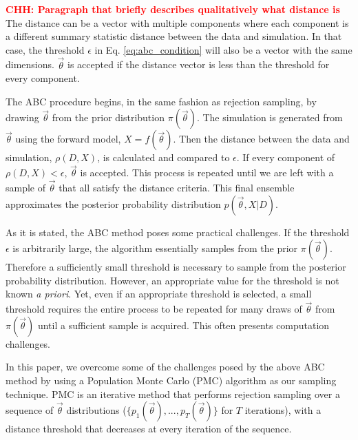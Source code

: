 \documentclass[12pt, preprint]{aastex}
\newcommand{\todo}[1]{{\bf \textcolor{red}{ #1}}}
\newcommand{\pars}{\vec{\theta}}
\begin{document}
\todo{CHH: Paragraph that briefly describes qualitatively what distance is}
The distance can be a vector with multiple components where each component is 
a different summary statistic distance between the data and simulation. 
In that case, the threshold $\epsilon$ in 
Eq. \ref{eq:abc_condition} will also be a vector with the same dimensions.  
$\pars$ is accepted if the distance vector is less than the threshold for 
every component.

The ABC procedure begins, in the same fashion as rejection sampling, by drawing 
$\pars$ from the prior distribution $\pi(\pars)$. The simulation is generated from 
$\pars$ using the forward model, $X = f(\pars)$. Then the distance between 
the data and simulation, $\rho(D, X)$, is calculated and compared to 
$\epsilon$. If every component of $\rho(D, X) < \epsilon$, $\pars$ is accepted. 
This process is repeated until we are left with a sample of $\pars$ that all 
satisfy the distance criteria. This final ensemble approximates the posterior 
probability distribution $p(\pars, X|D)$. 

As it is stated, the ABC method poses some practical challenges. If the 
threshold $\epsilon$ is arbitrarily large, the algorithm essentially 
samples from the prior $\pi(\pars)$. Therefore a sufficiently small threshold
is necessary to sample from the posterior probability distribution. However,
an appropriate value for the threshold is not known \emph{a priori}. Yet, 
even if an appropriate threshold is selected, a small threshold requires 
the entire process to be repeated for many draws of $\pars$ from $\pi(\pars)$ 
until a sufficient sample is acquired. This often presents computation challenges. 

In this paper, we overcome some of the challenges posed by the above ABC method
by using a Population Monte Carlo (PMC) algorithm as our sampling technique. 
PMC is an iterative method that performs rejection sampling over a 
sequence of $\pars$ distributions ($\{p_1(\pars), ..., p_T(\pars)\}$ for 
$T$ iterations), with a distance threshold that decreases at every iteration of 
the sequence. 
\end{document}
